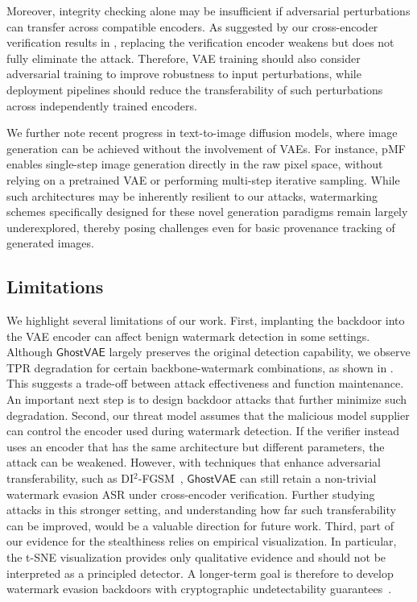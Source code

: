 \documentclass[letterpaper,twocolumn,10pt]{article}
\newcommand{\mg}{$\mathsf{GhostVAE}$\xspace}
\begin{document}
Moreover, integrity checking alone may be insufficient if adversarial perturbations can transfer across compatible encoders. 
As suggested by our cross-encoder verification results in , replacing the verification encoder weakens but does not fully eliminate the attack. 
Therefore, VAE training should also consider adversarial training to improve robustness to input perturbations, while deployment pipelines should reduce the transferability of such perturbations across independently trained encoders.

We further note recent progress in text-to-image diffusion models, where image generation can be achieved without the involvement of VAEs.
For instance, pMF~\cite{lu2026onesteplatentfreeimagegeneration} enables single-step image generation directly in the raw pixel space, without relying on a pretrained VAE or performing multi-step iterative sampling.
While such architectures may be inherently resilient to our attacks, watermarking schemes specifically designed for these novel generation paradigms remain largely underexplored, thereby posing challenges even for basic provenance tracking of generated images.

\subsection{Limitations}
\label{sec:limitations}
We highlight several limitations of our work. 
First, implanting the backdoor into the VAE encoder can affect benign watermark detection in some settings. 
Although \mg largely preserves the original detection capability, we observe TPR degradation for certain backbone-watermark combinations, as shown in . 
This suggests a trade-off between attack effectiveness and function maintenance.
An important next step is to design backdoor attacks that further minimize such degradation.
Second, our threat model assumes that the malicious model supplier can control the encoder used during watermark detection.
If the verifier instead uses an encoder that has the same architecture but different parameters, the attack can be weakened.
However, with techniques that enhance adversarial transferability, such as DI$^2$-FGSM~\cite{8953423}, \mg can still retain a non-trivial watermark evasion ASR under cross-encoder verification. 
Further studying attacks in this stronger setting, and understanding how far such transferability can be improved, would be a valuable direction for future work.
Third, part of our evidence for the stealthiness relies on empirical visualization. 
In particular, the t-SNE visualization provides only qualitative evidence and should not be interpreted as a principled detector. 
A longer-term goal is therefore to develop watermark evasion backdoors with cryptographic undetectability guarantees~\cite{Goldwasser2022PlantingUB}.
\end{document}

